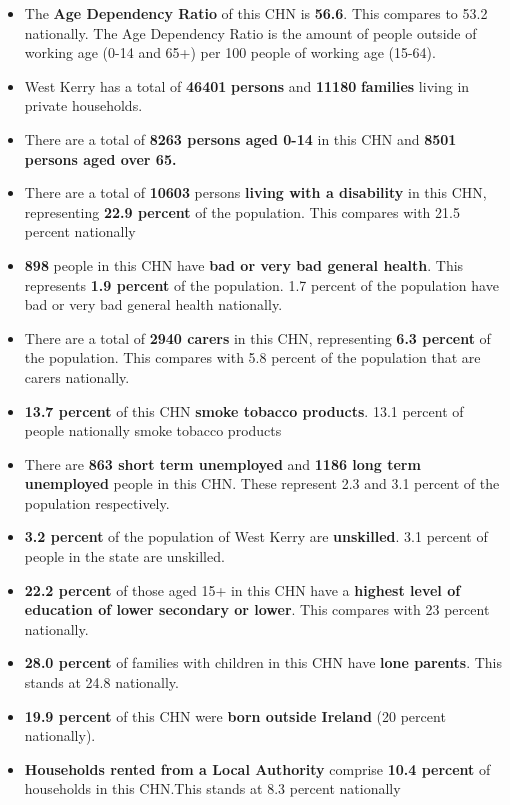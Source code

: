 \documentclass{article}
\begin{document}
\begin{itemize}

\item The \textbf{Age Dependency Ratio} of this CHN is  \textbf{56.6}. This compares to 53.2 nationally. The Age Dependency Ratio is the amount of people outside of working age (0-14 and 65+) per 100 people of working age (15-64). 

\item West Kerry has a total of \textbf{\num{46401}} \textbf{persons} and  \textbf{\num{11180}} \textbf{families} living in private households.

\item There are a total of \textbf{\num{8263} persons aged 0-14} in this CHN and \textbf{\num{8501} persons aged over 65.} 

\item There are a total of \textbf{\num{10603}} persons \textbf{living with a disability} in this CHN, representing \textbf{22.9 percent} of the population. This compares with  21.5 percent nationally

\item \textbf{\num{898}} people in this CHN have \textbf{bad or very bad general health}. This represents \textbf{1.9 percent} of the population. 1.7 percent of the population have bad or very bad general health nationally. 

\item There are a total of \textbf{\num{2940} carers} in this CHN, representing \textbf{6.3 percent} of the population. This compares with 5.8 percent of the population that are carers nationally. 

\item \textbf{13.7 percent} of this CHN \textbf{smoke tobacco products}. 13.1 percent of people nationally smoke tobacco products

\item There are \textbf{\num{863} short term unemployed} and \textbf{\num{1186} long term unemployed} people in this CHN. These represent 2.3 and 3.1 percent of the population respectively.

\item  \textbf{3.2 percent} of the population of West Kerry are \textbf{unskilled}. 3.1 percent of people in the state are unskilled.

\item \textbf{22.2 percent} of those aged 15+ in this CHN have a \textbf{highest level of education of lower secondary or lower}. This compares with 23 percent nationally. 

\item \textbf{28.0 percent} of families with children in this CHN have \textbf{lone parents}. This stands at 24.8 nationally.

\item \textbf{19.9 percent} of this CHN were \textbf{born outside Ireland} (20 percent nationally).

\item \textbf{Households rented from a Local Authority} comprise \textbf{10.4 percent} of households in this CHN.This stands at 8.3 percent nationally

\end{itemize}
\end{document}
